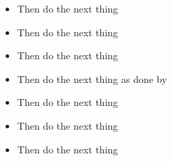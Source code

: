 \documentclass[10pt,a4paper]{protocol}
\begin{document}
\begin{itemize}
	\item Then do the next thing
	\item Then do the next thing
	\item Then do the next thing
\end{itemize}
\divider

\begin{itemize}
	\item Then do the next thing as done by \cite{einstein}
	\item Then do the next thing
	\item Then do the next thing
	\item Then do the next thing
\end{itemize}
\divider


\clearpage


\nocite{*}

\printbibliography


\divider


\end{document}
